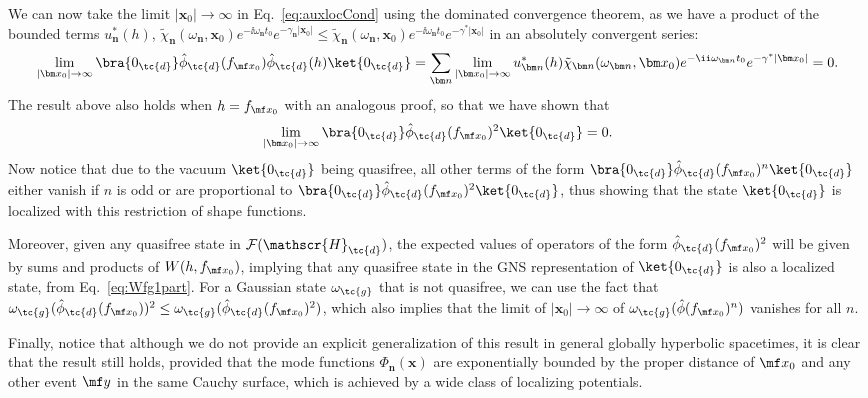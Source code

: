 We can now take the limit $|\bm x_0|\to \infty$ in Eq.~\eqref{eq:auxlocCond} using the dominated convergence theorem, as we have a product of the bounded terms $u_{\bm n}^*(h)$, $\tilde{\chi}_{\bm n}(\omega_{\bm n},\bm x_0)e^{-\ii \omega_{\bm n} t_0}e^{-\gamma_{\bm n}|\bm x_0|}\leq \tilde{\chi}_{\bm n}(\omega_{\bm n},\bm x_0)e^{-\ii \omega_{\bm n} t_0}e^{-\gamma^*|\bm x_0|}$ in an absolutely convergent series:
\begin{equation}
    \lim_{|\bm x_0|\to \infty }\bra{0_\tc{d}}\hat{\phi}_\tc{d}(f_{\mf x_0})\hat{\phi}_\tc{d}(h)\ket{0_\tc{d}} = \sum_{\bm n} \lim_{|\bm x_0|\to \infty} u_{\bm n}^*(h)\tilde{\chi}_{\bm n}(\omega_{\bm n},\bm x_0) e^{-\ii \omega_{\bm n} t_0} e^{-\gamma^*|\bm x_0|} = 0.
\end{equation}
The result above also holds when $h = f_{\mf x_0}$ with an analogous proof, so that we have shown that
\begin{equation}
    \lim_{|\bm x_0|\to \infty }\bra{0_\tc{d}}\hat{\phi}_\tc{d}(f_{\mf x_0})^2\ket{0_\tc{d}} =  0.
\end{equation}
Now notice that due to the vacuum $\ket{0_\tc{d}}$ being quasifree, all other terms of the form $\bra{0_\tc{d}}\hat{\phi}_\tc{d}(f_{\mf x_0})^n\ket{0_\tc{d}}$ either vanish if $n$ is odd or are proportional to $\bra{0_\tc{d}}\hat{\phi}_\tc{d}(f_{\mf x_0})^2\ket{0_\tc{d}}$, thus showing that the state $\ket{0_\tc{d}}$ is localized with this restriction of shape functions.

Moreover, given any quasifree state in $\mathcal{F}(\mathscr{H}_\tc{d})$, the expected values of operators of the form $\hat{\phi}_\tc{d}(f_{\mf x_0})^2$ will be given by sums and products of $W(h,{f}_{\mf x_0})$, implying that any quasifree state in the GNS representation of $\ket{0_\tc{d}}$ is also a localized state, from Eq.~\eqref{eq:Wfg1part}. For a Gaussian state $\omega_\tc{g}$ that is not quasifree, we can use the fact that $\omega_\tc{g}(\hat{\phi}_\tc{d}(f_{\mf x_0}))^2 \leq \omega_\tc{g}(\hat{\phi}_\tc{d}(f_{\mf x_0})^2)$, which also implies that the limit of $|\bm x_0|\to \infty$ of $\omega_\tc{g}(\hat{\phi}(f_{\mf x_0})^n)$ vanishes for all $n$.

Finally, notice that although we do not provide an explicit generalization of this result in general globally hyperbolic spacetimes, it is clear that the result still holds, provided that the mode functions $\Phi_{\bm n}(\bm x)$ are exponentially bounded by the proper distance of $\mf x_0$ and any other event $\mf y$ in the same Cauchy surface, which is achieved by a wide class of localizing potentials.


